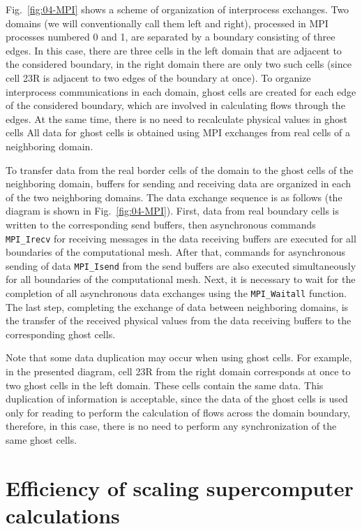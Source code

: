 \documentclass[
11pt,%
tightenlines,%
twoside,%
onecolumn,%
nofloats,%
nobibnotes,%
nofootinbib,%
superscriptaddress,%
noshowpacs,%
centertags]%
{revtex4}
\begin{document}
Fig.~\ref{fig:04-MPI} shows a scheme of organization of interprocess exchanges.
Two domains (we will conventionally call them left and right), processed in MPI processes numbered 0 and 1, are separated by a boundary consisting of three edges.
In this case, there are three cells in the left domain that are adjacent to the considered boundary, in the right domain there are only two such cells (since cell 23R is adjacent to two edges of the boundary at once).
To organize interprocess communications in each domain, ghost cells are created for each edge of the considered boundary, which are involved in calculating flows through the edges.
At the same time, there is no need to recalculate physical values in ghost cells
All data for ghost cells is obtained using MPI exchanges from real cells of a neighboring domain.

To transfer data from the real border cells of the domain to the ghost cells of the neighboring domain, buffers for sending and receiving data are organized in each of the two neighboring domains.
The data exchange sequence is as follows (the diagram is shown in Fig.~\ref{fig:04-MPI}).
First, data from real boundary cells is written to the corresponding send buffers, then asynchronous commands \texttt{MPI\_Irecv} for receiving messages in the data receiving buffers are executed for all boundaries of the computational mesh.
After that, commands for asynchronous sending of data \texttt{MPI\_Isend} from the send buffers are also executed simultaneously for all boundaries of the computational mesh.
Next, it is necessary to wait for the completion of all asynchronous data exchanges using the \texttt{MPI\_Waitall} function.
The last step, completing the exchange of data between neighboring domains, is the transfer of the received physical values from the data receiving buffers to the corresponding ghost cells.

Note that some data duplication may occur when using ghost cells.
For example, in the presented diagram, cell 23R from the right domain corresponds at once to two ghost cells in the left domain.
These cells contain the same data.
This duplication of information is acceptable, since the data of the ghost cells is used only for reading to perform the calculation of flows across the domain boundary, therefore, in this case, there is no need to perform any synchronization of the same ghost cells.

\section{Efficiency of scaling supercomputer calculations}
\end{document}
